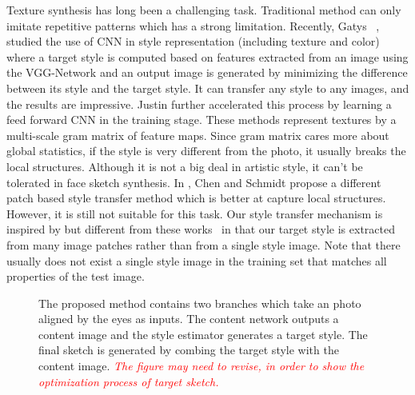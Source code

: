 \documentclass[10pt,twocolumn,letterpaper]{article}
\def\comm[#1]{{\small \textcolor{red}{\emph{#1}}}}
\begin{document}
Texture synthesis has long been a challenging task. Traditional method can only imitate repetitive patterns which has a strong limitation. Recently, Gatys \etal ~\cite{gatys2015texture,gatys2015neural}, studied the use of CNN in style representation (including texture and color) where a target style is computed based on features extracted from an image using the VGG-Network and an output image is generated by minimizing the difference between its style and the target style. It can transfer any style to any images, and the results are impressive. Justin \etal \cite{feifei2016} further accelerated this process by learning a feed forward CNN in the training stage. These methods represent textures by a multi-scale gram matrix of feature maps. Since gram matrix cares more about global statistics, if the style is very different from the photo, it usually breaks the local structures. Although it is not a big deal in artistic style, it can't be tolerated in face sketch synthesis. In \cite{Chen2016Patch}, Chen and Schmidt propose a different patch based style transfer method which is better at capture local structures. However, it is still not suitable for this task. Our style transfer mechanism is inspired by but different from these works~\cite{gatys2015texture,gatys2015neural,feifei2016} in that our target style is extracted from many image patches rather than from a single style image. Note that there usually does not exist a single style image in the training set that matches all properties of the test image. 

\begin{figure}[t]
\centering
{}
\caption{The proposed method contains two branches which take an photo aligned by the eyes as inputs. The content network outputs a content image and the style estimator generates a target style. The final sketch is generated by combing the target style with the content image. \comm[The figure may need to revise, in order to show the optimization process of target sketch.]}
\label{fig:overview}
\end{figure}
\end{document}
